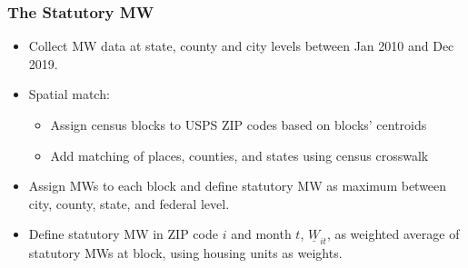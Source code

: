 \documentclass[aspectratio=169, t]{beamer}
\newcommand{\MW}{\underline{W}}
\begin{document}
\begin{frame}[label=stat_MW]
    \frametitle{The Statutory MW}
    
    \begin{itemize}
        \item
        Collect MW data at state, county and city levels between Jan 2010 and Dec 2019.
        
        \vspace{2mm}
        \item
        Spatial match:
        \begin{itemize}
            \item Assign census blocks to USPS ZIP codes based on blocks' centroids
            \item Add matching of places, counties, and states using census crosswalk
        \end{itemize}
        
        \vspace{2mm}
        \item
        Assign MWs to each block and define statutory MW as maximum between city, county, state, and federal level.
        
        \vspace{2mm}
        \item
        Define statutory MW in ZIP code $i$ and month $t$, $\MW_{it}$, as weighted
        average of statutory MWs at block, using housing units as weights.

    \end{itemize}
    
\end{frame}
\end{document}
